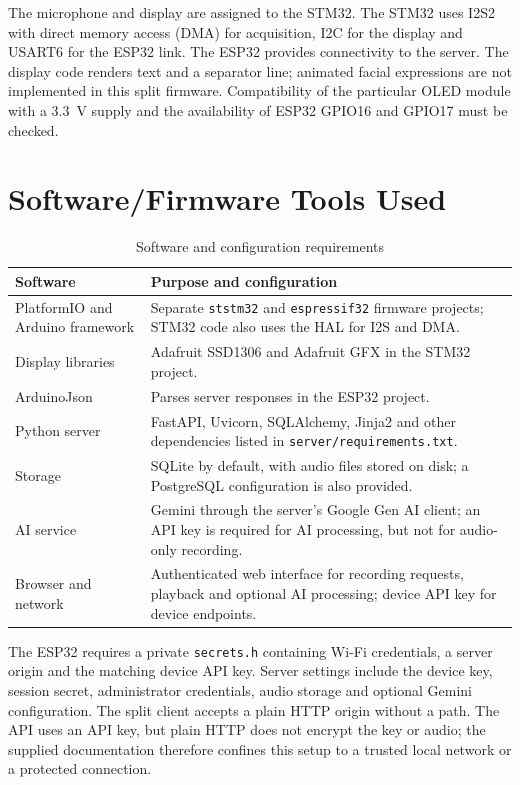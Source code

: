 \documentclass[a4paper,12pt,oneside]{report}
\begin{document}
The microphone and display are assigned to the STM32. The STM32 uses I2S2 with direct memory access (DMA) for acquisition, I2C for the display and USART6 for the ESP32 link. The ESP32 provides connectivity to the server. The display code renders text and a separator line; animated facial expressions are not implemented in this split firmware. Compatibility of the particular OLED module with a 3.3~V supply and the availability of ESP32 GPIO16 and GPIO17 must be checked.

\section{Software/Firmware Tools Used}
\begin{table}[htbp]
\centering
\caption{Software and configuration requirements}
\label{tab:software}
\small
\begin{tabularx}{\textwidth}{@{}lX@{}}
\toprule
Software & Purpose and configuration \\
\midrule
PlatformIO and Arduino framework & Separate \texttt{ststm32} and \texttt{espressif32} firmware projects; STM32 code also uses the HAL for I2S and DMA. \\
Display libraries & Adafruit SSD1306 and Adafruit GFX in the STM32 project. \\
ArduinoJson & Parses server responses in the ESP32 project. \\
Python server & FastAPI, Uvicorn, SQLAlchemy, Jinja2 and other dependencies listed in \texttt{server/requirements.txt}. \\
Storage & SQLite by default, with audio files stored on disk; a PostgreSQL configuration is also provided. \\
AI service & Gemini through the server's Google Gen AI client; an API key is required for AI processing, but not for audio-only recording. \\
Browser and network & Authenticated web interface for recording requests, playback and optional AI processing; device API key for device endpoints. \\
\bottomrule
\end{tabularx}
\end{table}

The ESP32 requires a private \texttt{secrets.h} containing Wi-Fi credentials, a server origin and the matching device API key. Server settings include the device key, session secret, administrator credentials, audio storage and optional Gemini configuration. The split client accepts a plain HTTP origin without a path. The API uses an API key, but plain HTTP does not encrypt the key or audio; the supplied documentation therefore confines this setup to a trusted local network or a protected connection.
\end{document}
